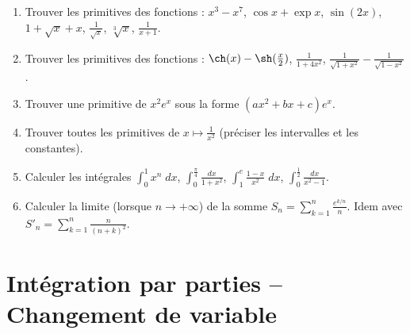 \documentclass[class=report,crop=false]{standalone}
\begin{document}
%
%
%






\begin{miniexercices}
\sauteligne
\begin{enumerate}
  \item Trouver les primitives des fonctions : $x^3-x^7$, $\cos x+\exp x$, $\sin(2x)$, $1+\sqrt{x}+x$,
$\frac{1}{\sqrt x}$, $\sqrt[3]{x}$, $\frac{1}{x+1}$.
  \item Trouver les primitives des fonctions : $\ch (x)-\sh (\frac{x}{2})$, $\frac{1}{1+4x^2}$,
$\frac{1}{\sqrt {1+x^2}} - \frac{1}{\sqrt {1-x^2}}$.
  \item Trouver une primitive de $x^2e^x$ sous la forme $(a x^2+b x+c)e^x$.
  \item Trouver toutes les primitives de $x\mapsto \frac{1}{x^2}$ (préciser les intervalles et les constantes).
  \item Calculer les intégrales $\int_0^1 x^n \; dx$, $\int_0^{\frac\pi4} \frac{dx}{1+x^2}$,
$\int_1^e \frac{1-x}{x^2}\; dx$, $\int_0^{\frac12} \frac{dx}{x^2-1}$.
  \item Calculer la limite (lorsque $n\to+\infty$) de la somme
$S_n = \sum_{k=1}^n \frac{e^{k/n}}{n}$. 
Idem avec $S'_n = \sum_{k=1}^n \frac{n}{(n+k)^2}$.
\end{enumerate}
\end{miniexercices}


\section{Intégration par parties -- Changement de variable}
\label{sec:int4}
\end{document}
